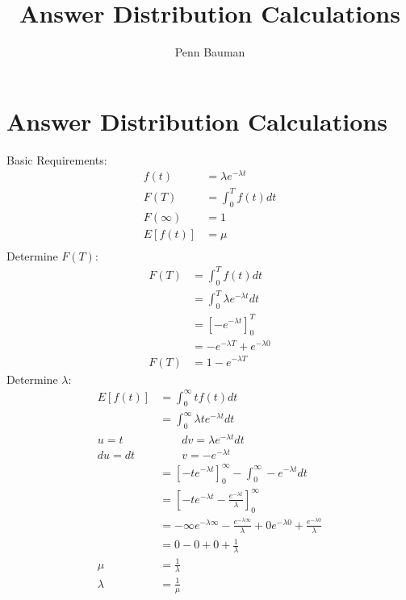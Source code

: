 \documentclass[12pt]{article}
\author{Penn Bauman}
\title{Answer Distribution Calculations}
\begin{document}
\section{Answer Distribution Calculations}

Basic Requirements:
\begin{align*}
	f(t) &= \lambda e^{-\lambda t} \\
	F(T) &= \int_{0}^{T} f(t) dt \\
	F(\infty) &= 1 \\
	E[f(t)] &= \mu \\
\end{align*}
Determine $F(T)$:
\begin{align*}
	F(T) &= \int_{0}^{T} f(t) dt \\
		&= \int_{0}^{T} \lambda e^{-\lambda t} dt \\
		&= \left[-e^{-\lambda t}\right]_{0}^{T} \\
		&= -e^{-\lambda T} + e^{-\lambda 0} \\
	F(T) &= 1 - e^{-\lambda T}
\end{align*}
Determine $\lambda$:
\begin{align*}
	E[f(t)] &= \int_{0}^{\infty} t f(t) dt \\
		&= \int_{0}^{\infty} \lambda t e^{-\lambda t} dt \\
	u = t & \ \ \ \ \ \ \ \ \ dv = \lambda e^{-\lambda t} dt \\
	du  =  dt & \ \ \ \ \ \ \ \ \ v = -e^{-\lambda t} \\
		&= \left[-t e^{-\lambda t}\right]_{0}^{\infty} - \int_{0}^{\infty} - e^{-\lambda t} dt \\
		&= \left[-t e^{-\lambda t} - \frac{e^{-\lambda t}}{\lambda}\right]_{0}^{\infty} \\
		&= -\infty e^{-\lambda \infty} - \frac{e^{-\lambda \infty}}{\lambda}
		+ 0 e^{-\lambda 0} + \frac{e^{-\lambda 0}}{\lambda} \\
		&= 0 - 0 + 0 + \frac{1}{\lambda} \\
	\mu &= \frac{1}{\lambda} \\
	\lambda &= \frac{1}{\mu} \\
\end{align*}
\end{document}
